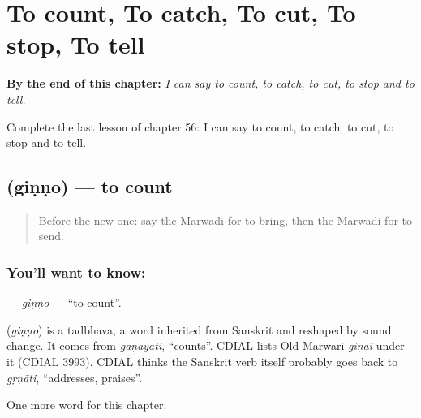 
\chapter{To count, To catch, To cut, To stop, To tell}
\label{ch:mw-to-count-to-catch-to-cut-to-stop-to-tell}

\begin{chapteropening}
\textbf{By the end of this chapter:} \emph{I can say to count, to catch, to cut, to stop and to tell.}

Complete the last lesson of chapter 56: I can say to count, to catch, to cut, to stop and to tell.
\end{chapteropening}

\section[\texorpdfstring{\mw{गिणणो} (giṇṇo)}{गिणणो (giṇṇo)}]{ (giṇṇo) — to count}

\label{lesson:MW-C56-ginno}



\begin{quote}
Before the new one: say the Marwadi for to bring, then the Marwadi for to send.
\end{quote}

\subsection*{You'll want to know: }
\textbf{} — \emph{giṇṇo} — \textquotedblleft{}to count\textquotedblright{}.

\begin{cousinweb}
\textbf{} (\emph{giṇṇo}) is a tadbhava, a word inherited from Sanskrit and reshaped by sound change. It comes from \emph{gaṇayati}, \textquotedblleft{}counts\textquotedblright{}. CDIAL lists Old Marwari \emph{giṇaï} under it (CDIAL 3993). CDIAL thinks the Sanskrit verb itself probably goes back to \emph{gṛṇāti}, \textquotedblleft{}addresses, praises\textquotedblright{}.
\end{cousinweb}

\begin{grammarlens}[title={What you've built}]
One more word for this chapter.
\end{grammarlens}

